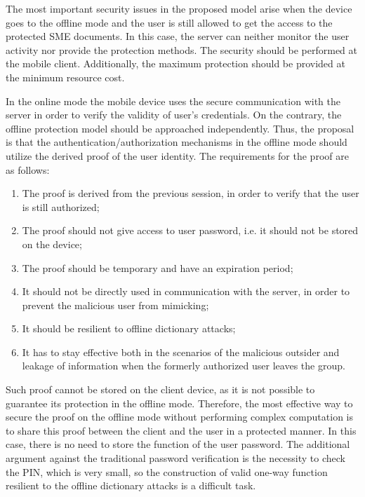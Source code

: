 \documentclass[twocolumn]{svjour3}          	%
\begin{document}
The most important security issues in the proposed model arise when the device goes to the offline mode and the user is still allowed to get the access to the protected SME documents. In this case, the server can neither monitor the user activity nor provide the protection methods. The security should be performed at the mobile client. Additionally, the maximum protection should be provided at the minimum resource cost. 

In the online mode the mobile device uses the secure communication with the server in order to verify the validity of user’s credentials. On the contrary, the offline protection model should be approached independently. Thus, the proposal is that the authentication/authorization mechanisms in the offline mode should utilize the derived proof of the user identity. The requirements for the proof are as follows:

\begin{enumerate}
	\item The proof is derived from the previous session, in order to verify that the user is still authorized;
	\item The proof should not give access to user password, i.e. it should not be stored on the device;
	\item The proof should be temporary and have an expiration period;
	\item It should not be directly used in communication with the server, in order to prevent the malicious user from mimicking;
	\item It should be resilient to offline dictionary attacks;
	\item It has to stay effective both in the scenarios of the malicious outsider and leakage of information when the formerly authorized user leaves the group.
\end{enumerate}

Such proof cannot be stored on the client device, as it is not possible to guarantee its protection in the offline mode. Therefore, the most effective way to secure the proof on the offline mode without performing complex computation is to share this proof between the client and the user in a protected manner. In this case, there is no need to store the function of the user password. The additional argument against the traditional password verification is the necessity to check the PIN, which is very small, so the construction of valid one-way function resilient to the offline dictionary attacks is a difficult task.
\end{document}
